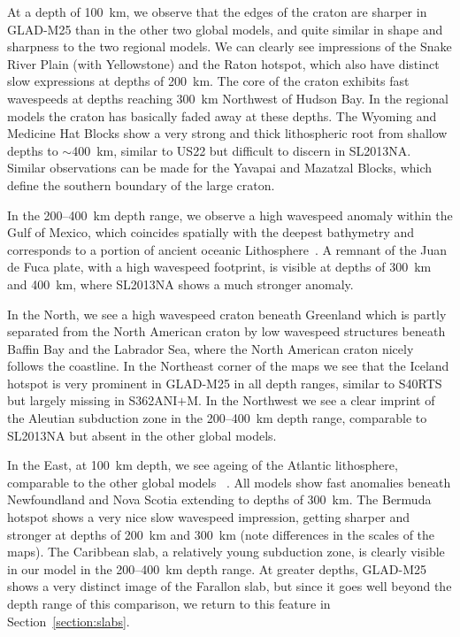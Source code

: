 \documentclass[extra,mreferee]{gji}
\begin{document}
At a depth of 100~km, we observe that the edges of the craton are sharper in
GLAD-M25 than in the other two global models,
and quite similar in shape and sharpness to the two regional models.
We can clearly see impressions of the Snake River Plain (with Yellowstone)
and the Raton hotspot, which also have distinct slow expressions at depths of 200~km.
The core of the craton exhibits fast wavespeeds at depths reaching 300~km Northwest of
Hudson Bay.
In the regional models the craton has basically faded away at these depths.
The Wyoming and Medicine Hat Blocks show a very strong and thick lithospheric
root from shallow depths to $\sim$400~km, similar to US22 but
difficult to discern in SL2013NA.
Similar observations can be made for the Yavapai and
Mazatzal Blocks, which define the southern boundary of the large craton.

In the 200--400~km depth range, we observe a high wavespeed
anomaly within the Gulf of Mexico, which coincides spatially with the deepest
bathymetry and corresponds to a portion of ancient oceanic
Lithosphere~\citep{muller2008}.
A remnant of the Juan de Fuca plate,
with a high wavespeed footprint, is visible at depths of 300~km and 400~km,
where SL2013NA shows a much stronger anomaly.

In the North, we see a high wavespeed craton beneath Greenland which is partly
separated from the North American craton by low wavespeed structures beneath
Baffin Bay and the Labrador Sea, where the North American craton nicely follows
the coastline.
In the Northeast corner of the maps we see that the Iceland hotspot is very
prominent in GLAD-M25 in all depth ranges, similar to S40RTS but largely missing
in S362ANI$+$M. In the Northwest we see a clear imprint of the Aleutian
subduction zone in the 200--400~km depth range, comparable to SL2013NA but absent
in the other global models.

In the East, at 100~km depth,
we see ageing of the Atlantic lithosphere, comparable to the other global models
~\citep{muller2008, schaeffer2014imaging}.
All models show fast anomalies beneath Newfoundland and Nova Scotia extending to
depths of 300~km. The Bermuda hotspot shows a very nice slow wavespeed impression,
getting sharper and stronger at depths of 200~km and 300~km (note differences in
the scales of the maps).
The Caribbean slab, a relatively young subduction zone, is clearly
visible in our model in the 200--400~km depth range.
At greater depths,
GLAD-M25 shows a very distinct image of the Farallon slab,
but since it goes well beyond the depth range of this comparison,
we return to this feature in Section~\ref{section:slabs}.
\end{document}
